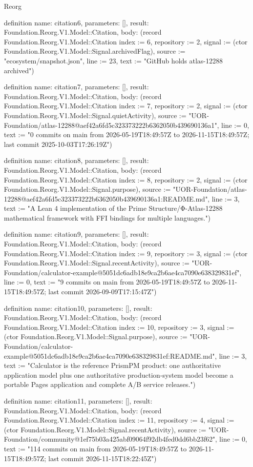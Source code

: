 \begin{lexlean}{Reorg}
\begin{semanticmodule}
definition{
  name: citation6,
  parameters: [],
  result: Foundation.Reorg.V1.Model::Citation,
  body: (record Foundation.Reorg.V1.Model::Citation {index := 6, repository := 2, signal := (ctor Foundation.Reorg.V1.Model::Signal.archivedFlag), source := "ecosystem/snapshot.json", line := 23, text := "GitHub holds atlas-12288 archived"})
}

definition{
  name: citation7,
  parameters: [],
  result: Foundation.Reorg.V1.Model::Citation,
  body: (record Foundation.Reorg.V1.Model::Citation {index := 7, repository := 2, signal := (ctor Foundation.Reorg.V1.Model::Signal.quietActivity), source := "UOR-Foundation/atlas-12288@aef42a6fd5c323373222b6362050b439690136a1", line := 0, text := "0 commits on main from 2026-05-19T18:49:57Z to 2026-11-15T18:49:57Z; last commit 2025-10-03T17:26:19Z"})
}

definition{
  name: citation8,
  parameters: [],
  result: Foundation.Reorg.V1.Model::Citation,
  body: (record Foundation.Reorg.V1.Model::Citation {index := 8, repository := 2, signal := (ctor Foundation.Reorg.V1.Model::Signal.purpose), source := "UOR-Foundation/atlas-12288@aef42a6fd5c323373222b6362050b439690136a1:README.md", line := 3, text := "A Lean 4 implementation of the Prime Structure/Φ-Atlas-12288 mathematical framework with FFI bindings for multiple languages."})
}

definition{
  name: citation9,
  parameters: [],
  result: Foundation.Reorg.V1.Model::Citation,
  body: (record Foundation.Reorg.V1.Model::Citation {index := 9, repository := 3, signal := (ctor Foundation.Reorg.V1.Model::Signal.recentActivity), source := "UOR-Foundation/calculator-example@5051dc6adb18e9ca2b6ae4ca7090e638329831ef", line := 0, text := "9 commits on main from 2026-05-19T18:49:57Z to 2026-11-15T18:49:57Z; last commit 2026-09-09T17:15:47Z"})
}

definition{
  name: citation10,
  parameters: [],
  result: Foundation.Reorg.V1.Model::Citation,
  body: (record Foundation.Reorg.V1.Model::Citation {index := 10, repository := 3, signal := (ctor Foundation.Reorg.V1.Model::Signal.purpose), source := "UOR-Foundation/calculator-example@5051dc6adb18e9ca2b6ae4ca7090e638329831ef:README.md", line := 3, text := "Calculator is the reference PrismPM product: one authoritative application model plus one authoritative production-system model become a portable Pages application and complete A/B service releases."})
}

definition{
  name: citation11,
  parameters: [],
  result: Foundation.Reorg.V1.Model::Citation,
  body: (record Foundation.Reorg.V1.Model::Citation {index := 11, repository := 4, signal := (ctor Foundation.Reorg.V1.Model::Signal.recentActivity), source := "UOR-Foundation/community@1ef75b03a425abf09064f92db4fed0dd6bb23f62", line := 0, text := "114 commits on main from 2026-05-19T18:49:57Z to 2026-11-15T18:49:57Z; last commit 2026-11-15T18:22:45Z"})
}


\end{semanticmodule}
\end{lexlean}

